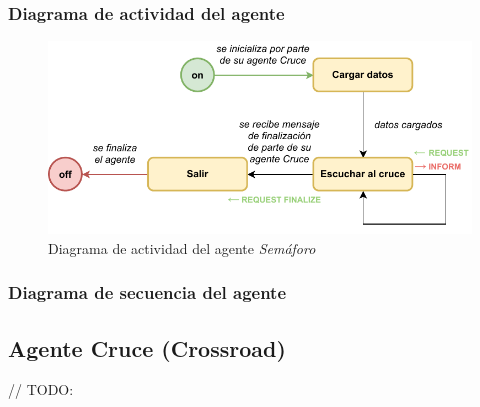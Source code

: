 \subsubsection{Diagrama de actividad del agente}
\begin{figure}[H]
    \centering
    \includegraphics[width=1\linewidth]{text/image/DAgen-DA-TrafficLight.pdf}
    \caption{Diagrama de actividad del agente \textit{Semáforo}}
    \label{fig:da_agente_semaforo}
\end{figure}

\subsubsection{Diagrama de secuencia del agente}

\subsection{Agente Cruce (Crossroad)}
// TODO:
